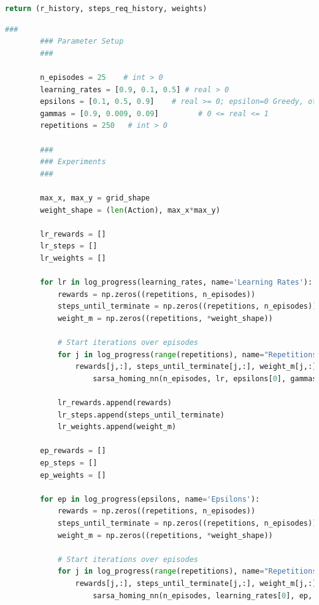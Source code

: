 \documentclass[11pt,journal,transmag,final]{IEEEtran}
\begin{document}
\begin{appendices}
\begin{lstlisting}[language=Python, caption=SARSA Algorithm Implementation, basicstyle=\footnotesize, label=lst:sarsa]
    return (r_history, steps_req_history, weights)
        \end{lstlisting}

        \begin{lstlisting}[language=Python, caption=Running Several Experiments, basicstyle=\footnotesize, label=lst:experiments]
        ###
        ### Parameter Setup
        ###
        
        n_episodes = 25    # int > 0
        learning_rates = [0.9, 0.1, 0.5] # real > 0
        epsilons = [0.1, 0.5, 0.9]    # real >= 0; epsilon=0 Greedy, otherwise epsilon-Greedy
        gammas = [0.9, 0.009, 0.09]         # 0 <= real <= 1
        repetitions = 250   # int > 0
        
        ###
        ### Experiments
        ###
        
        max_x, max_y = grid_shape
        weight_shape = (len(Action), max_x*max_y)
        
        lr_rewards = []
        lr_steps = []
        lr_weights = []
        
        for lr in log_progress(learning_rates, name='Learning Rates'):
            rewards = np.zeros((repetitions, n_episodes)) 
            steps_until_terminate = np.zeros((repetitions, n_episodes))
            weight_m = np.zeros((repetitions, *weight_shape))
        
            # Start iterations over episodes
            for j in log_progress(range(repetitions), name="Repetitions"):
                rewards[j,:], steps_until_terminate[j,:], weight_m[j,:] =
                    sarsa_homing_nn(n_episodes, lr, epsilons[0], gammas[0])
            
            lr_rewards.append(rewards)
            lr_steps.append(steps_until_terminate)
            lr_weights.append(weight_m)
            
        ep_rewards = []
        ep_steps = []
        ep_weights = []
        
        for ep in log_progress(epsilons, name='Epsilons'):
            rewards = np.zeros((repetitions, n_episodes))
            steps_until_terminate = np.zeros((repetitions, n_episodes))
            weight_m = np.zeros((repetitions, *weight_shape))
        
            # Start iterations over episodes
            for j in log_progress(range(repetitions), name="Repetitions"):
                rewards[j,:], steps_until_terminate[j,:], weight_m[j,:] =
                    sarsa_homing_nn(n_episodes, learning_rates[0], ep, gammas[0])
            

\end{lstlisting}
\end{appendices}
\end{document}
